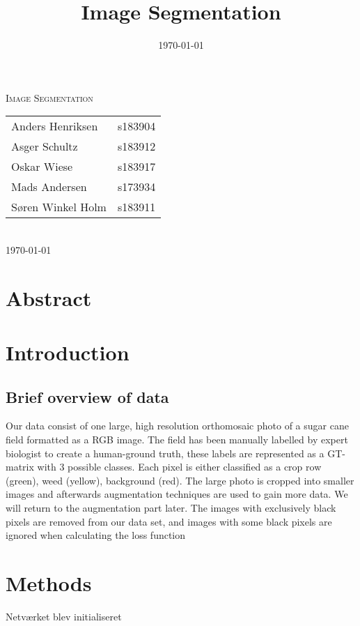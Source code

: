 \documentclass[12pt,fleqn]{article}
\title{Image Segmentation}
\author{}
\date{\today}
\begin{document}

\begin{titlepage}
	\begin{center}
		\textsc{\LARGE Image Segmentation}\\
		[1.0cm]
		{
		\large
		\begin{tabular}{lr}
			Anders Henriksen&s183904\\
			Asger Schultz&s183912\\
			Oskar Wiese&s183917\\
			Mads Andersen&s173934\\

			Søren Winkel Holm&s183911
		\end{tabular}
		}\\
		[0.5cm]
		\textsc{\large \today}
	\end{center}
\end{titlepage}
\tableofcontents \newpage

\section{Abstract}
\section{Introduction}
\subsection{Brief overview of data}
Our data consist of one large, high resolution orthomosaic photo of a sugar cane field formatted as a RGB image. The field has been manually labelled by expert biologist to create a human-ground truth, these labels are represented as a GT-matrix with 3 possible classes. Each pixel is either classified as a crop row (green), weed (yellow), background (red). The large photo is cropped into smaller images and afterwards augmentation techniques are used to gain more data. We will return to the augmentation part later. The images with exclusively black pixels are removed from our data set, and images with some black pixels are ignored when calculating the loss function 

\section{Methods}
Netværket blev initialiseret
\\
\\
\end{document}
